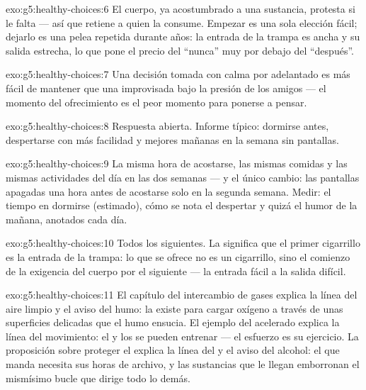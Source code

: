 \begin{solution}{exo:g5:healthy-choices:6}
El cuerpo, ya acostumbrado a una sustancia, protesta si le falta ---
así que retiene a quien la consume. Empezar es una sola elección
fácil; dejarlo es una pelea repetida durante años: la entrada de la
trampa es ancha y su salida estrecha, lo que pone el precio del
``nunca'' muy por debajo del ``después''.
\end{solution}

\begin{solution}{exo:g5:healthy-choices:7}
Una decisión tomada con calma por adelantado es más fácil de mantener
que una improvisada bajo la presión de los amigos --- el momento del
ofrecimiento es el peor momento para ponerse a pensar.
\end{solution}

\begin{solution}{exo:g5:healthy-choices:8}
Respuesta abierta. Informe típico: dormirse antes, despertarse con más
facilidad y mejores mañanas en la semana sin pantallas.
\end{solution}

\begin{solution}{exo:g5:healthy-choices:9}
La misma hora de acostarse, las mismas comidas y las mismas
actividades del día en las dos semanas --- y el único cambio: las
pantallas apagadas una hora antes de acostarse solo en la segunda
semana. Medir: el tiempo en dormirse (estimado), cómo se nota el
despertar y quizá el humor de la mañana, anotados cada día.
\end{solution}

\begin{solution}{exo:g5:healthy-choices:10}
Todos los siguientes. La  significa que el primer cigarrillo
es la entrada de la trampa: lo que se ofrece no es un cigarrillo, sino
el comienzo de la exigencia del cuerpo por el siguiente --- la entrada
fácil a la salida difícil.
\end{solution}

\begin{solution}{exo:g5:healthy-choices:11}
El capítulo del intercambio de gases explica la línea del aire limpio
y el aviso del humo: la  existe para cargar oxígeno a
través de unas superficies delicadas que el humo ensucia. El ejemplo
del  acelerado explica la línea del movimiento: el  y
los  se pueden entrenar --- el esfuerzo es su ejercicio. La
proposición sobre proteger el  explica la línea del  y el
aviso del alcohol: el que manda necesita sus horas de archivo, y las
sustancias que le llegan emborronan el mismísimo bucle que dirige todo
lo demás.
\end{solution}
